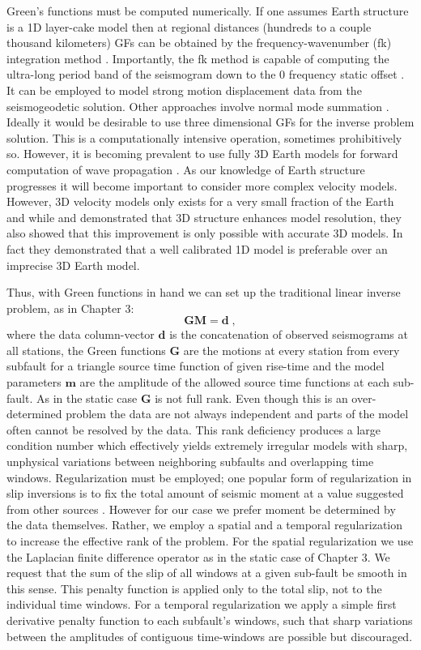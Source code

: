 Green's functions must be computed numerically. If one assumes Earth structure is a 1D layer-cake model then at regional distances (hundreds to a couple thousand kilometers) GFs can be obtained by the frequency-wavenumber (fk) integration method \citep{saikia1994}. Importantly, the fk method is capable of computing the ultra-long period band of the seismogram down to the 0 frequency static offset \citep{zhu2002}. It can be employed to model strong motion displacement data from the seismogeodetic solution. Other approaches involve normal mode summation \citep{yue2011}. Ideally it would be desirable to use three dimensional GFs for the inverse problem solution. This is a computationally intensive operation, sometimes prohibitively so. However, it is becoming prevalent to use fully 3D Earth models for forward computation of wave propagation \citep{bielak2010,tromp2010}. As our knowledge of Earth structure progresses it will become important to consider more complex velocity models. However, 3D velocity models only exists for a very small fraction of the Earth and while \citet{graves2001} and \citet{wald2001} demonstrated that 3D structure enhances model resolution, they also showed that this improvement is only possible with accurate 3D models. In fact they demonstrated that a well calibrated 1D model is preferable over an imprecise 3D Earth model.

Thus, with Green functions in hand we can set up the traditional linear inverse problem, as in Chapter 3:
\begin{equation}
\label{eq:inv}
\mathbf{GM}=\mathbf{d}\;,
\end{equation}
where the data column-vector $\mathbf{d}$ is the concatenation of observed seismograms at all stations, the Green functions $\mathbf{G}$ are the motions at every station from every subfault for a triangle source time function of given rise-time and the model parameters $\mathbf{m}$ are the amplitude of the allowed source time functions at each sub-fault. As in the static case $\mathbf{G}$ is not full rank. Even though this is an over-determined problem the data are not always independent and parts of the model often cannot be resolved by the data. This rank deficiency produces a large condition number which effectively yields extremely irregular models with sharp, unphysical variations between neighboring subfaults and overlapping time windows. Regularization must be employed; one popular form of regularization in slip inversions is to fix the total amount of seismic moment at a value suggested from other sources \citep{ji2002b}. However for our case we prefer moment be determined by the data themselves. Rather, we employ a spatial and a temporal regularization to increase the effective rank of the problem. For the spatial regularization we use the Laplacian finite difference operator as in the static case of Chapter 3. We request that the sum of the slip of all windows at a given sub-fault be smooth in this sense. This penalty function is applied only to the total slip, not to the individual time windows. For a temporal regularization we apply a simple first derivative penalty function to each subfault's windows, such that sharp variations between the amplitudes of contiguous time-windows are possible but discouraged. 

